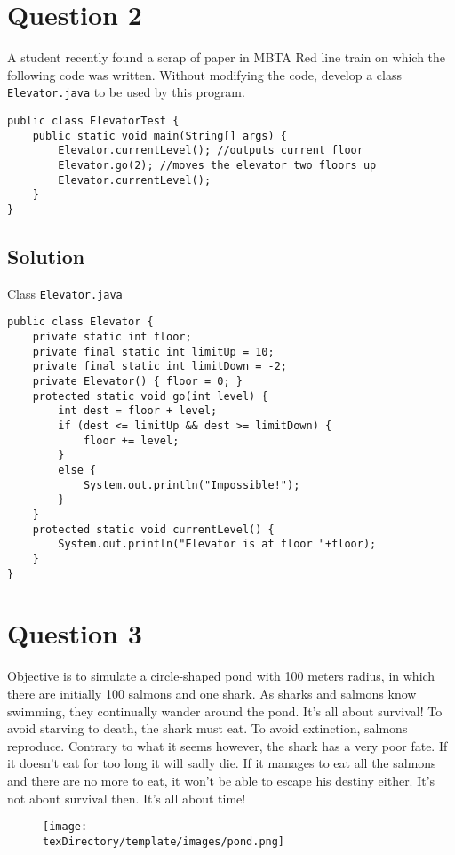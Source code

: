 \documentclass[12pt,letterpaper,twoside]{article}
\begin{document}
\section*{Question 2}

A student recently found a scrap of paper in MBTA Red line train on which the following code was written. Without modifying the code, develop a class \texttt{Elevator.java} to be used by this program.
\lstset{language=java,tabsize=2}
\begin{lstlisting}
public class ElevatorTest {
	public static void main(String[] args) {
		Elevator.currentLevel(); //outputs current floor
		Elevator.go(2); //moves the elevator two floors up
		Elevator.currentLevel();
	}
}
\end{lstlisting}

\subsection*{Solution}

Class \texttt{Elevator.java}
\lstset{language=java}
\begin{lstlisting}
public class Elevator {
	private static int floor;
	private final static int limitUp = 10;
	private final static int limitDown = -2;
	private Elevator() { floor = 0; }
	protected static void go(int level) {
		int dest = floor + level;
		if (dest <= limitUp && dest >= limitDown) {
			floor += level;
		}
		else {
			System.out.println("Impossible!");
		}
	}
	protected static void currentLevel() {
		System.out.println("Elevator is at floor "+floor);
	}
}
\end{lstlisting}

\section*{Question 3}

Objective is to simulate a circle-shaped pond with 100 meters radius, in which there are initially 100 salmons and one shark. As sharks and salmons know swimming, they continually wander around the pond. It's all about survival! To avoid starving to death, the shark must eat. To avoid extinction, salmons reproduce. Contrary to what it seems however, the shark has a very poor fate. If it doesn't eat for too long it will sadly die. If it manages to eat all the salmons and there are no more to eat, it won't be able to escape his destiny either. It's not about survival then. It's all about time!
\begin{figure}[H]\centering
\texttt{[image: \\texDirectory/template/images/pond.png]}
\end{figure}
\end{document}
